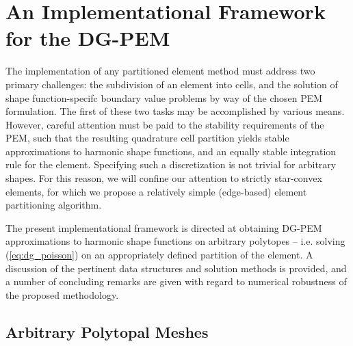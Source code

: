 \chapter{An Implementational Framework \\ for the DG-PEM} \label{ch:implementation}
%
The implementation of any partitioned element method must address two primary challenges: the subdivision of an element into cells, and the solution of shape function-specifc boundary value problems by way of the chosen PEM formulation. The first of these two tasks may be accomplished by various means. However, careful attention must be paid to the stability requirements of the PEM, such that the resulting quadrature cell partition yields stable approximations to harmonic shape functions, and an equally stable integration rule for the element. Specifying such a discretization is not trivial for arbitrary shapes. For this reason, we will confine our attention to strictly star-convex elements, for which we propose a relatively simple (edge-based) element partitioning algorithm.

The present implementational framework is directed at obtaining DG-PEM approximations to harmonic shape functions on arbitrary polytopes -- i.e. solving (\ref{eq:dg_poisson}) on an appropriately defined partition of the element. A discussion of the pertinent data structures and solution methods is provided, and a number of concluding remarks are given with regard to numerical robustness of the proposed methodology.

\section{Arbitrary Polytopal Meshes}

